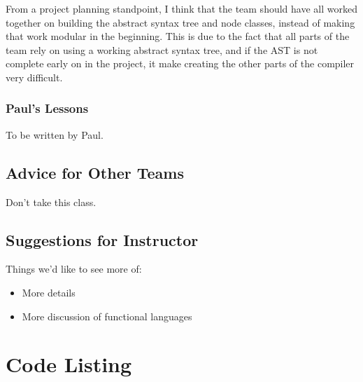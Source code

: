 \documentclass{report}
\begin{document}
From a project planning standpoint, I think that the team should have all worked 
together on building the abstract syntax tree and node classes, instead of making
that work modular in the beginning. This is due to the fact that all parts of the team
rely on using a working abstract syntax tree, and if the AST is not complete early on
in the project, it make creating the other parts of the compiler very difficult. 

\subsection{Paul's Lessons}
\label{sub:pauls-lessons}

To be written by Paul.

\section{Advice for Other Teams}

Don't take this class.

\section{Suggestions for Instructor}

Things we'd like to see more of:

\begin{itemize}
\item More details  
\item More discussion of functional languages
\end{itemize}

\appendix

\chapter{Code Listing}
\end{document}
